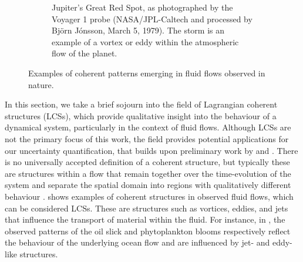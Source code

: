 \begin{figure}
\begin{center}
\begin{subfigure}[t]{\textwidth}
			\caption{Jupiter's Great Red Spot, as photographed by the Voyager 1 probe (NASA/JPL-Caltech and processed by Bj\"{o}rn J\'{o}nsson, March 5, 1979).
			The storm is an example of a vortex or eddy within the atmospheric flow of the planet.}
		\end{subfigure}
		\caption{Examples of coherent patterns emerging in fluid flows observed in nature.}
		\label{fig:lcs_examples}
	\end{center}
\end{figure}

In this section, we take a brief sojourn into the field of Lagrangian coherent structures (LCSs), which provide qualitative insight into the behaviour of a dynamical system, particularly in the context of fluid flows.
Although LCSs are not the primary focus of this work, the field provides potential applications for our uncertainty quantification, that builds upon preliminary work by \citet{Balasuriya_2020_StochasticSensitivityComputable,Balasuriya_2020_UncertaintyFinitetimeLyapunov} and \citet{BadzaEtAl_2023_HowSensitiveAre}.
There is no universally accepted definition of a coherent structure, but typically these are structures within a flow that remain together over the time-evolution of the system and separate the spatial domain into regions with qualitatively different behaviour \citep{BalasuriyaEtAl_2018_GeneralizedLagrangianCoherent}.
 shows examples of coherent structures in observed fluid flows, which can be considered LCSs.
These are structures such as vortices, eddies, and jets that influence the transport of material within the fluid.
For instance, in , the observed patterns of the oil slick and phytoplankton blooms respectively reflect the behaviour of the underlying ocean flow and are influenced by jet- and eddy-like structures.

